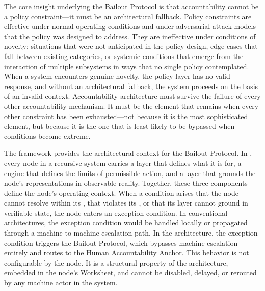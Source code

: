 The core insight underlying the Bailout Protocol is that accountability cannot be a policy constraint—it must be an architectural fallback. Policy constraints are effective under normal operating conditions and under adversarial attack models that the policy was designed to address. They are ineffective under conditions of novelty: situations that were not anticipated in the policy design, edge cases that fall between existing categories, or systemic conditions that emerge from the interaction of multiple subsystems in ways that no single policy contemplated. When a system encounters genuine novelty, the policy layer has no valid response, and without an architectural fallback, the system proceeds on the basis of an invalid context. Accountability architecture must survive the failure of every other accountability mechanism. It must be the element that remains when every other constraint has been exhausted—not because it is the most sophisticated element, but because it is the one that is least likely to be bypassed when conditions become extreme.

The \bxthree framework provides the architectural context for the Bailout Protocol. In \bxthree, every node in a recursive system carries a \purpose layer that defines what it is for, a \bounds engine that defines the limits of permissible action, and a \fact layer that grounds the node's representations in observable reality. Together, these three components define the node's operating context. When a condition arises that the node cannot resolve within its \purpose, that violates its \bounds, or that its \fact layer cannot ground in verifiable state, the node enters an exception condition. In conventional architectures, the exception condition would be handled locally or propagated through a machine-to-machine escalation path. In the \bxthree architecture, the exception condition triggers the Bailout Protocol, which bypasses machine escalation entirely and routes to the Human Accountability Anchor. This behavior is not configurable by the node. It is a structural property of the architecture, embedded in the node's Worksheet, and cannot be disabled, delayed, or rerouted by any machine actor in the system.

